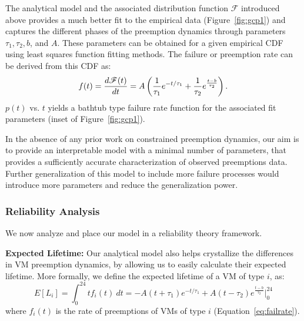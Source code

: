 The analytical model and the associated  distribution function $\mathscr{F}$ introduced above provides a much better fit to the empirical data (Figure~\ref{fig:gcp1}) and captures the different phases of the preemption dynamics through parameters $\tau_1, \tau_2, b$, and $A$. These parameters can be obtained for a given empirical CDF using least squares function fitting methods. The failure or preemption rate can be derived from this CDF as:
\begin{equation}
  \label{eq:failrate}
    \vspace*{\eqnspace}
f(t) = \dfrac{d \mathscr{F}(t)} {dt} = A \left(\dfrac{1}{\tau_1}e^{-t/\tau_1} + \dfrac{1}{\tau_2}e^{\frac{t-b}{\tau_2}}\right).
\end{equation}
$p(t)$ vs. $t$ yields a bathtub type failure rate function for the associated fit parameters (inset of Figure~\ref{fig:gcp1}).


In the absence of any prior work on constrained preemption dynamics, our aim is to provide an interpretable model with a minimal number of parameters, that provides a sufficiently accurate characterization of observed preemptions data. 
Further generalization of this model to include more failure processes would introduce more parameters and reduce the generalization power. 


\subsubsection{Reliability Analysis}
\label{subsec:reliability}

We now analyze and place our model in a reliability theory framework. 
%

\noindent \textbf{Expected Lifetime:} Our analytical model also helps crystallize the differences in VM preemption dynamics, by allowing us to easily calculate their expected lifetime. 
More formally, we define the expected lifetime of a VM of type $i$, as: 
\begin{equation}
  \label{eq:expected-lifetime}
E[L_i] =  \int_{0}^{24} t {f_i}(t)~dt =  -A(t+\tau_1)e^{-t/\tau_1} + A(t-\tau_2) e^{\frac{t-b}{\tau_2}} \biggr\rvert_{0}^{24}
\end{equation}
where $f_i(t)$ is the rate of preemptions of VMs of type $i$ (Equation~\ref{eq:failrate}).
%

